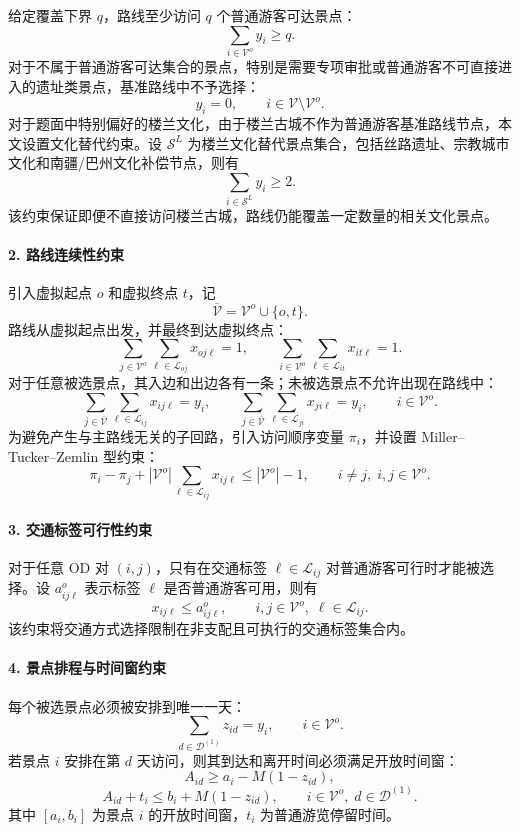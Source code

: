 \documentclass[UTF8,zihao=-4,a4paper]{ctexart}
\begin{document}
给定覆盖下界 $q$，路线至少访问 $q$ 个普通游客可达景点：
\[
\sum_{i\in\mathcal{V}^{o}}y_i\geq q.
\]
对于不属于普通游客可达集合的景点，特别是需要专项审批或普通游客不可直接进入的遗址类景点，基准路线中不予选择：
\[
y_i=0,\qquad i\in \mathcal{V}\setminus \mathcal{V}^{o}.
\]
对于题面中特别偏好的楼兰文化，由于楼兰古城不作为普通游客基准路线节点，本文设置文化替代约束。设 $\mathcal{S}^{L}$ 为楼兰文化替代景点集合，包括丝路遗址、宗教城市文化和南疆/巴州文化补偿节点，则有
\[
\sum_{i\in\mathcal{S}^{L}}y_i\geq 2.
\]
该约束保证即便不直接访问楼兰古城，路线仍能覆盖一定数量的相关文化景点。

\paragraph{2. 路线连续性约束}

引入虚拟起点 $o$ 和虚拟终点 $t$，记
\[
\overline{\mathcal{V}}=\mathcal{V}^{o}\cup\{o,t\}.
\]
路线从虚拟起点出发，并最终到达虚拟终点：
\[
\sum_{j\in\mathcal{V}^{o}}\sum_{\ell\in\mathcal{L}_{oj}}x_{oj\ell}=1,
\qquad
\sum_{i\in\mathcal{V}^{o}}\sum_{\ell\in\mathcal{L}_{it}}x_{it\ell}=1.
\]
对于任意被选景点，其入边和出边各有一条；未被选景点不允许出现在路线中：
\[
\sum_{j\in\overline{\mathcal{V}}}\sum_{\ell\in\mathcal{L}_{ij}}x_{ij\ell}
=
y_i,
\qquad
\sum_{j\in\overline{\mathcal{V}}}\sum_{\ell\in\mathcal{L}_{ji}}x_{ji\ell}
=
y_i,
\qquad i\in\mathcal{V}^{o}.
\]
为避免产生与主路线无关的子回路，引入访问顺序变量 $\pi_i$，并设置 Miller--Tucker--Zemlin 型约束：
\[
\pi_i-\pi_j+
|\mathcal{V}^{o}|
\sum_{\ell\in\mathcal{L}_{ij}}x_{ij\ell}
\leq
|\mathcal{V}^{o}|-1,
\qquad i\neq j,\; i,j\in\mathcal{V}^{o}.
\]

\paragraph{3. 交通标签可行性约束}

对于任意 OD 对 $(i,j)$，只有在交通标签 $\ell\in\mathcal{L}_{ij}$ 对普通游客可行时才能被选择。设 $a_{ij\ell}^{o}$ 表示标签 $\ell$ 是否普通游客可用，则有
\[
x_{ij\ell}\leq a_{ij\ell}^{o},
\qquad
i,j\in\mathcal{V}^{o},\;\ell\in\mathcal{L}_{ij}.
\]
该约束将交通方式选择限制在非支配且可执行的交通标签集合内。

\paragraph{4. 景点排程与时间窗约束}

每个被选景点必须被安排到唯一一天：
\[
\sum_{d\in\mathcal{D}^{(1)}} z_{id}=y_i,
\qquad i\in\mathcal{V}^{o}.
\]
若景点 $i$ 安排在第 $d$ 天访问，则其到达和离开时间必须满足开放时间窗：
\[
A_{id}\geq a_i-M(1-z_{id}),
\]
\[
A_{id}+t_i\leq b_i+M(1-z_{id}),
\qquad i\in\mathcal{V}^{o},\;d\in\mathcal{D}^{(1)}.
\]
其中 $[a_i,b_i]$ 为景点 $i$ 的开放时间窗，$t_i$ 为普通游览停留时间。
\end{document}
